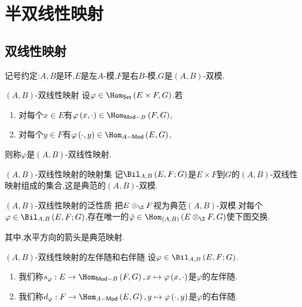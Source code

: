 \chapter{半双线性映射}

\section{双线性映射}

记号约定:$A,B$是环,$E$是左$A$-模,$F$是右$B$-模,$G$是$\left(A,B\right)$-双模.

\begin{definition}{$\left(A,B\right)$-双线性映射}{}
	设$\varphi\in\Hom_{\mathsf{Set}}\left(E\times F,G\right)$.若
	\begin{enumerate}
		\item 对每个$x\in E$有$\varphi\left(x,\cdot\right)\in\Hom_{\mathsf{Mod}-B}\left(F,G\right)$,
		\item 对每个$y\in F$有$\varphi\left(\cdot,y\right)\in\Hom_{A-\mathsf{Mod}}\left(E,G\right)$,
	\end{enumerate}
	则称$\varphi$是$\left(A,B\right)$-双线性映射.
\end{definition}

\begin{definition}{$\left(A,B\right)$-双线性映射的映射集}{}
	记$\Bil_{A,B}\left(E,F;G\right)$是$E\times F$到$G$的$\left(A,B\right)$-双线性映射组成的集合,这是典范的$\left(A,B\right)$-双模.
\end{definition}

\begin{proposition}{$\left(A,B\right)$-双线性映射的泛性质}{}
	把$E\otimes_{\Z}F$视为典范$\left(A,B\right)$-双模.对每个$\varphi\in\Bil_{A,B}\left(E,F;G\right)$,存在唯一的$\bar{\varphi}\in\Hom_{\left(A,B\right)}\left(E\otimes_{\Z}F,G\right)$使下图交换.
	\begin{center}
	\end{center}
	其中,水平方向的箭头是典范映射.
\end{proposition}

\begin{definition}{$\left(A,B\right)$-双线性映射的左伴随和右伴随}{}
	设$\varphi\in\Bil_{A,B}\left(E,F;G\right)$.
	\begin{enumerate}
		\item 我们称$s_{\varphi}:E\to\Hom_{\mathsf{Mod}-B}\left(F,G\right),x\mapsto\varphi\left(x,\cdot\right)$是$\varphi$的左伴随.
		\item 我们称$d_{\varphi}:F\to\Hom_{A-\mathsf{Mod}}\left(E,G\right),y\mapsto\varphi\left(\cdot,y\right)$是$\varphi$的右伴随.
	\end{enumerate}
\end{definition}

